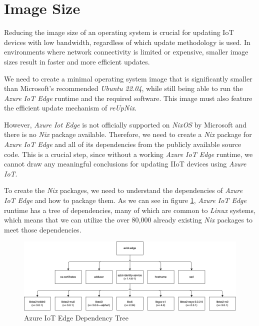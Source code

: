 \section{Image Size}
\label{sec:image-size}
Reducing the image size of an operating system is crucial for updating IoT devices
with low bandwidth, regardless of which update methodology is used.
In environments where network connectivity is limited or expensive,
smaller image sizes result in faster and more efficient updates.

We need to create a minimal operating system image that is significantly smaller
than Microsoft's recommended \textit{Ubuntu 22.04}, while still being able to run the
\textit{Azure IoT Edge} runtime and the required software. This image must also
feature the efficient update mechanism of \textit{reUpNix}.

However, \textit{Azure Iot Edge} is not officially supported on \textit{NixOS}
by Microsoft and there is no \textit{Nix} package available. Therefore, we need
to create a \textit{Nix} package for \textit{Azure IoT Edge} and all of its
dependencies from the publicly available source code. This is a crucial step, since
without a working \textit{Azure IoT Edge} runtime, we cannot draw any meaningful
conclusions for updating \ac{IIoT} devices using \textit{Azure IoT}.

To create the \textit{Nix} packages, we need to understand the dependencies of
\textit{Azure IoT Edge} and how to package them. As we can see in figure
\ref{fig:dependency-tree}, \textit{Azure IoT Edge} runtime has a tree of dependencies,
many of which are common to \textit{Linux} systems, which means that we can
utilize the over 80,000 already existing \textit{Nix} packages to meet
those dependencies.
\clearpage

\begin{figure}[H]
    \centering
    \includegraphics[width=\textwidth]{fig/dependecy-tree.drawio.png}
    \caption{Azure IoT Edge Dependency Tree}
    \label{fig:dependency-tree}
\end{figure}


